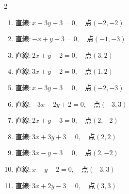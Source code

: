 \begin{multicols}{2}
\begin{enumerate}
  \item $直線:x-3y+3=0,\quad 点 ( -2, -2 )$


  \item $直線:-x+y+3=0,\quad 点 ( -1, -3 )$


\columnbreak %

\resetques

  \item $直線:2x+y-2=0,\quad 点 ( 3, 2 )$


  \item $直線:3x+y-2=0,\quad 点 ( 1, 2 )$


  \item $直線:x-3y-3=0,\quad 点 ( -2, -3 )$


  \item $直線:-3x-2y+2=0,\quad 点 ( -3, 3 )$


  \item $直線:2x+y-3=0,\quad 点 ( 2, -2 )$


  \item $直線:3x+3y+3=0,\quad 点 ( 2, 2 )$


  \item $直線:3x-y+3=0,\quad 点 ( 2, -2 )$


  \item $直線:x-y-2=0,\quad 点 ( -3, 3 )$


  \item $直線:3x+2y-3=0,\quad 点 ( 3, 3 )$



\end{enumerate}
\end{multicols}
